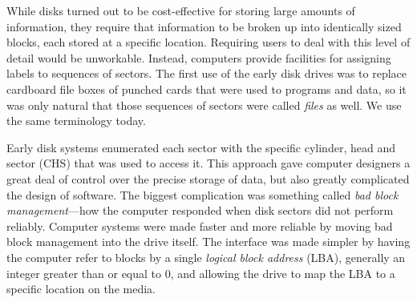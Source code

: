 

While disks turned out to be cost-effective  for storing large
amounts of information, they require that information to be broken up
into identically sized blocks, each stored at a
specific location. Requiring users to deal with this level of detail
would be unworkable. Instead, computers provide facilities for
assigning labels to sequences of sectors. The first use of the early
disk drives was to replace cardboard file boxes of punched cards that
were used to programs and data, so it was only natural that those
sequences of sectors were called \emph{files} as well. We use the same
terminology today.

Early disk systems enumerated each sector with the specific cylinder,
head and sector (CHS) that was used to access it. This approach gave
computer designers a great deal of control over the precise storage of
data, but also greatly complicated the design of software. The biggest
complication was something called \emph{bad block management}---how
the computer responded when disk sectors did not perform reliably.
Computer systems were made faster and more reliable by moving bad
block management into the drive itself. The interface was made
simpler by having the computer refer to blocks by a single
\emph{logical block address} (LBA), generally an integer greater than
or equal to 0, and allowing the drive to map the LBA to a specific
location on the media. 

